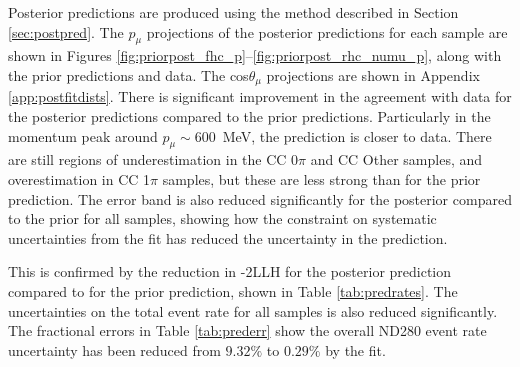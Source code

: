 Posterior predictions are produced using the method described in Section \ref{sec:postpred}. The $p_{\mu}$ projections of the posterior predictions for each sample are shown in Figures \ref{fig:priorpost_fhc_p}--\ref{fig:priorpost_rhc_numu_p}, along with the prior predictions and data. The cos$\theta_{\mu}$ projections are shown in Appendix \ref{app:postfitdists}. There is significant improvement in the agreement with data for the posterior predictions compared to the prior predictions. Particularly in the momentum peak around $p_{\mu}\sim$600~MeV, the prediction is closer to data. There are still regions of underestimation in the CC 0$\pi$ and CC Other samples, and overestimation in CC 1$\pi$ samples, but these are less strong than for the prior prediction. The error band is also reduced significantly for the posterior compared to the prior for all samples, showing how the constraint on systematic uncertainties from the fit has reduced the uncertainty in the prediction. 

This is confirmed by the reduction in -2LLH for the posterior prediction compared to for the prior prediction, shown in Table \ref{tab:predrates}. The uncertainties on the total event rate for all samples is also reduced significantly. The fractional errors in Table \ref{tab:prederr} show the overall ND280 event rate uncertainty has been reduced from $9.32\%$ to $0.29\%$ by the fit.

